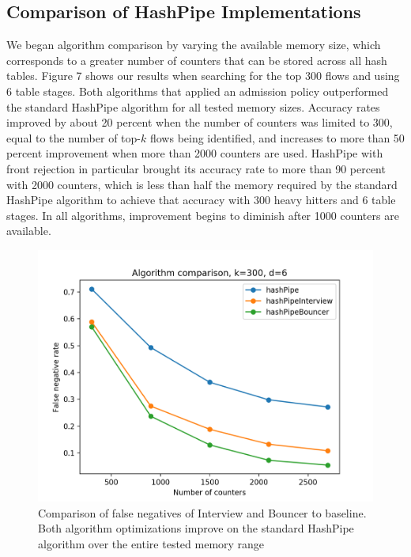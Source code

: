 \subsection{Comparison of HashPipe Implementations}
We began algorithm comparison by varying the available memory size, which corresponds to a greater number of counters that can be stored across all hash tables. Figure 7 shows our results when searching for the top 300 flows and using 6 table stages. Both algorithms that applied an admission policy outperformed the standard HashPipe algorithm for all tested memory sizes. Accuracy rates improved by about 20 percent when the number of counters was limited to 300, equal to the number of top-$k$ flows being identified, and increases to more than 50 percent improvement when more than 2000 counters are used. HashPipe with front rejection in particular brought its accuracy rate to more than 90 percent with 2000 counters, which is less than half the memory required by the standard HashPipe algorithm to achieve that accuracy with 300 heavy hitters and 6 table stages. In all algorithms, improvement begins to diminish after 1000 counters are available.
\begin{figure}[t]
  \centering
    \includegraphics[scale=0.5]{falsenegatives}
     \caption{Comparison of false negatives of Interview and Bouncer to baseline. Both algorithm optimizations improve on the standard HashPipe algorithm over the entire tested memory range}
     \label{fig:bp-image}
\end{figure}

